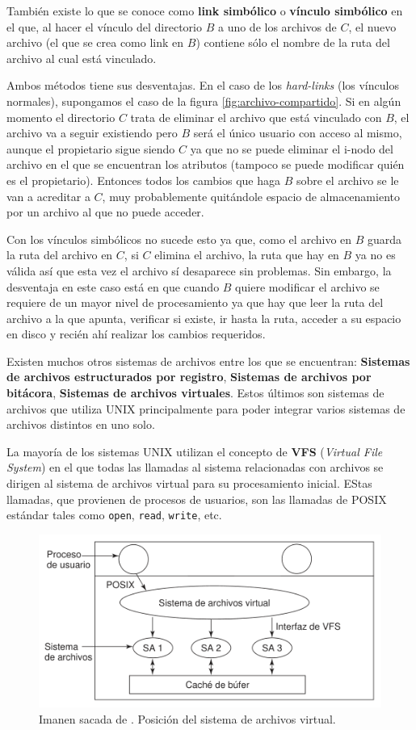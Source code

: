 \documentclass[12pt]{article}
\begin{document}
  También existe lo que se conoce como \textbf{link simbólico} o \textbf{vínculo simbólico} en el que, al hacer el vínculo del directorio $ B $ a uno de los archivos de $ C $, el nuevo archivo (el que se crea como link en $ B $) contiene sólo el nombre de la ruta del archivo al cual está vinculado. 
  
  Ambos métodos tiene sus desventajas. En el caso de los \textit{hard-links} (los vínculos normales), supongamos el caso de la figura \ref{fig:archivo-compartido}. Si en algún momento el directorio $ C $ trata de eliminar el archivo que está vinculado con $ B $, el archivo va a seguir existiendo pero $ B $ será el único usuario con acceso al mismo, aunque el propietario sigue siendo $ C $ ya que no se puede eliminar el i-nodo del archivo en el que se encuentran los atributos (tampoco se puede modificar quién es el propietario). Entonces todos los cambios que haga $ B $ sobre el archivo se le van a acreditar a $ C $, muy probablemente quitándole espacio de almacenamiento por un archivo al que no puede acceder.

  Con los vínculos simbólicos no sucede esto ya que, como el archivo en $ B $ guarda la ruta del archivo en $ C $, si $ C $ elimina el archivo, la ruta que hay en $ B $ ya no es válida así que esta vez el archivo sí desaparece sin problemas. Sin embargo, la desventaja en este caso está en que cuando $ B $ quiere modificar el archivo se requiere de un mayor nivel de procesamiento ya que hay que leer la ruta del archivo a la que apunta, verificar si existe, ir hasta la ruta, acceder a su espacio en disco y recién ahí realizar los cambios requeridos.

  Existen muchos otros sistemas de archivos entre los que se encuentran: \textbf{Sistemas de archivos estructurados por registro}, \textbf{Sistemas de archivos por bitácora}, \textbf{Sistemas de archivos virtuales}. Estos últimos son sistemas de archivos que utiliza UNIX principalmente para poder integrar varios sistemas de archivos distintos en uno solo. 

  La mayoría de los sistemas UNIX utilizan el concepto de \textbf{VFS} (\textit{Virtual File System}) en el que todas las llamadas al sistema relacionadas con archivos se dirigen al sistema de archivos virtual para su procesamiento inicial. EStas llamadas, que provienen de procesos de usuarios, son las llamadas de POSIX estándar tales como \verb|open|, \verb|read|, \verb|write|, etc.

  \begin{figure}[H]
    \centering
    \includegraphics[width=0.7\linewidth]{imagenes/vfs.png}
    \caption{Imanen sacada de \parencite{tanenbaum}. Posición del sistema de archivos virtual.}
    \label{fig:vfs}
  \end{figure}
\end{document}
